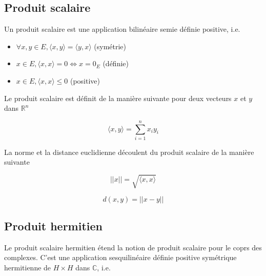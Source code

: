 \newpage

\subsection{Produit scalaire} 

\noindent Un produit scalaire est une application bilinéaire semie définie positive, i.e. \newline

\begin{itemize}
    \item $\forall x,y \in E, \langle x, y \rangle = \langle y, x \rangle$ (symétrie) \newline
    \item $x \in E, \langle x, x \rangle = 0 \Longleftrightarrow x = 0_E$ (définie) \newline
    \item $x \in E, \langle x, x \rangle \le 0$ (positive) \newline
\end{itemize}

\noindent Le produit scalaire est définit de la manière suivante pour deux vecteurs $x$ et $y$ dans $\mathbb{R}^n$

\begin{equation}
    \langle x, y \rangle = \sum_{i=1}^{n} x_i y_i
\end{equation}

\noindent La norme et la distance euclidienne découlent du produit scalaire de la manière suivante

\begin{equation}
    || x || = \sqrt{\langle x, x \rangle}
\end{equation}

\begin{equation}
    d(x,y) = || x - y ||
\end{equation}

\subsection{Produit hermitien}

\noindent Le produit scalaire hermitien étend la notion de produit scalaire pour le coprs des complexes. C'est une application sesquilinéaire définie positive symétrique hermitienne de $H \times H$ dans $\mathbb{C}$, i.e.

